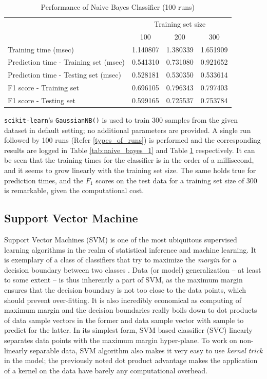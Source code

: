 \documentclass{article}
\begin{document}
	\begin{table}[h]
		\centering
		\begin{tabular}{l|ccc}
			\toprule
			{} & \multicolumn{3}{c}{Training set size} \\
			{} &       100 &       200 &       300 \\
			\midrule
			Training time (msec)                  &  1.140807 &  1.380339 &  1.651909 \\
			Prediction time - Training set (msec) &  0.541310 &  0.731080 &  0.921652 \\
			Prediction time - Testing set (msec)  &  0.528181 &  0.530350 &  0.533614 \\
			F1 score - Training set               &  0.696105 &  0.796343 &  0.797403 \\
			F1 score - Testing set                &  0.599165 &  0.725537 &  0.753784 \\
			\bottomrule
		\end{tabular}
		\caption{Performance of Naive Bayes Classifier (100 runs)}
		\label{tab:naive_bayes_100}
	\end{table}
	
	\texttt{scikit-learn}'s \texttt{GaussianNB()} is used to train 300 samples from the given dataset in default setting; no additional parameters are provided. A single run followed by 100 runs (Refer \ref{types_of_runs}) is performed and the corresponding results are logged in Table \ref{tab:naive_bayes_1} and Table \ref{tab:naive_bayes_100} respectively. It can be seen that the training times for the classifier is in the order of a millisecond, and it seems to grow linearly with the training set size. The same holds true for prediction times, and the $F_1$ scores on the test data for a training set size of 300 is remarkable, given the computational cost. 
	        
	\subsection{Support Vector Machine}
	Support Vector Machines (SVM) is one of the most ubiquitous supervised learning algorithms in the realm of statistical inference and machine learning. It is exemplary of a class of classifiers that try to maximize the \emph{margin} for a decision boundary between two classes \cite{boser1992}. Data (or model) generalization -- at least to some extent -- is thus inherently a part of SVM, as the maximum margin ensures that the decision boundary is not too close to the data points, which should prevent over-fitting. It is also incredibly economical as computing of maximum margin and the decision boundaries really boils down to dot products of data sample vectors in the former and data sample vector with sample to predict for the latter. In its simplest form, SVM based classifier (SVC) linearly separates data points with the maximum margin hyper-plane. To work on non-linearly separable data, SVM algorithm also makes it very easy to use \emph{kernel trick} in the model; the previously noted dot product advantage makes the application of a kernel on the data have barely any computational overhead. 
	
\end{document}
